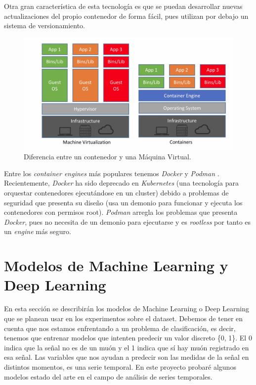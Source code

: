 Otra gran característica de esta tecnología es que se puedan desarrollar nuevas actualizaciones del propio contenedor de forma fácil, pues utilizan por debajo un sistema de versionamiento.

\begin{figure}[H]
	\includegraphics[scale=0.3]{imagenes/03_Estado_del_arte/containers.png}
	\centering
	\caption{Diferencia entre un contenedor y una Máquina Virtual.}
\end{figure}

Entre los \textit{container engines} más populares tenemos \textit{Docker} \cite{docker} y \textit{Podman} \cite{podman}. Recientemente, \textit{Docker} ha sido deprecado en \textit{Kubernetes} (una tecnología para orquestar contenedores ejecutándose en un cluster) debido a problemas de seguridad que presenta su diseño (usa un demonio para funcionar y ejecuta los contenedores con permisos root). \textit{Podman} arregla los problemas que presenta \textit{Docker}, pues no necesita de un demonio para ejecutarse y es \textit{rootless} por tanto es un \textit{engine} más seguro.

\section{Modelos de Machine Learning y Deep Learning}

En esta sección se describirán los modelos de Machine Learning o Deep Learning que se planean usar en los experimentos sobre el dataset. Debemos de tener en cuenta que nos estamos enfrentando a un problema de clasificación, es decir, tenemos que entrenar modelos que intenten predecir un valor discreto \{0, 1\}. El 0 indica que la señal no es de un muón y el 1 indica que sí hay muón registrado en esa señal. Las variables que nos ayudan a predecir son las medidas de la señal en distintos momentos, es una serie temporal. En este proyecto probaré algunos modelos estado del arte en el campo de análisis de series temporales.

